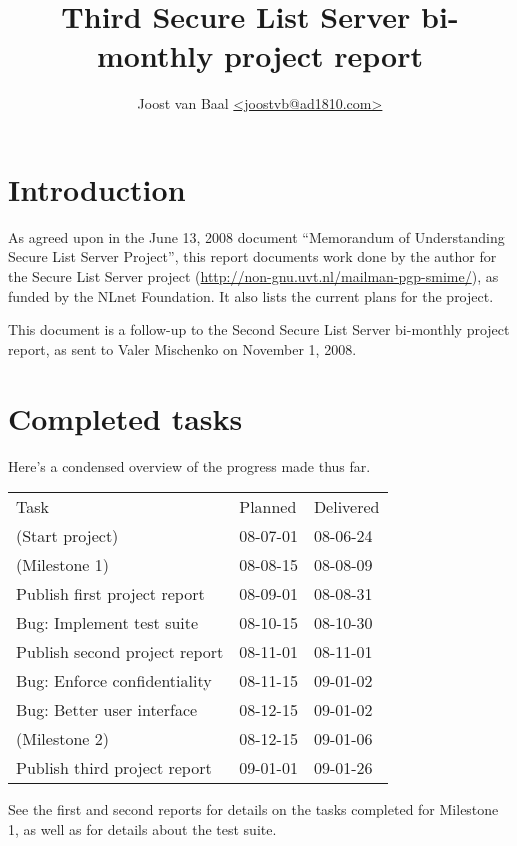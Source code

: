 \documentclass[a4]{article}
\title{Third Secure List Server bi-monthly project report}
\author{Joost van Baal \url{<joostvb@ad1810.com>}}
\begin{document}
\maketitle

\setlength{\parindent}{0pt}
\setlength{\parskip}{1.5ex}

\section*{Introduction}

As agreed upon in the June 13, 2008 document ``Memorandum of Understanding
Secure List Server Project'', this report documents work done by the author for
the Secure List Server project
(\url{http://non-gnu.uvt.nl/mailman-pgp-smime/}), as funded by the NLnet
Foundation.  It also lists the current plans for the project.

This document is a follow-up to the Second Secure List Server bi-monthly
project report, as sent to Valer Mischenko on November 1, 2008.

\section{Completed tasks}

Here's a condensed overview of the progress made thus far.

\begin{tabular}{lll}
 Task                            & Planned  & Delivered   \\ \cline{1-3}
 (Start project)                 & 08-07-01 & 08-06-24    \\
 (Milestone 1)                   & 08-08-15 & 08-08-09    \\
 Publish first project report    & 08-09-01 & 08-08-31    \\
 Bug: Implement test suite       & 08-10-15 & 08-10-30    \\
 Publish second project report   & 08-11-01 & 08-11-01    \\
 Bug: Enforce confidentiality    & 08-11-15 & 09-01-02    \\
 Bug: Better user interface      & 08-12-15 & 09-01-02    \\
 (Milestone 2)                   & 08-12-15 & 09-01-06    \\
 Publish third project report    & 09-01-01 & 09-01-26    \\
\end{tabular}

See the first and second reports for details on the tasks completed for
Milestone 1, as well as for details about the test suite.
\end{document}
